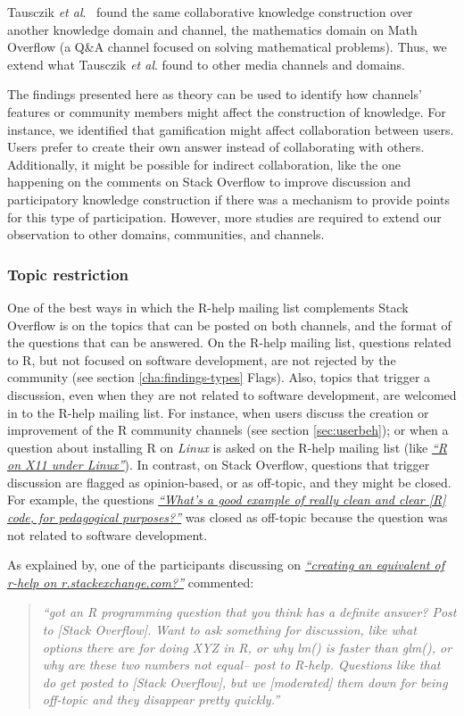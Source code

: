     Tausczik \textit{et al}.~\cite{Tausczik2014} found the same collaborative knowledge construction over another knowledge domain and channel, the mathematics domain on Math Overflow (a Q\&A channel focused on solving mathematical problems).
    Thus, we extend what Tausczik \textit{et al}. found to other media channels and domains.

    The findings presented here as theory can be used to identify how channels' features or community members might affect the construction of knowledge.
    For instance, we identified that gamification might affect collaboration between users. 
    Users prefer to create their own answer instead of collaborating with others.
    Additionally, it might be possible for indirect collaboration, like the one happening on the comments on Stack Overflow to improve discussion and participatory knowledge construction if there was a mechanism to provide points for this type of participation.
    However, more studies are required to extend our observation to other domains, communities, and channels.

\subsubsection{Topic restriction}

    One of the best ways in which the R-help mailing list complements Stack Overflow is on the topics that can be posted on both channels, and the format of the questions that can be answered. 
    On the R-help mailing list, questions related to R, but not focused on software development, are not rejected by the community (see section \ref{cha:findings-types} Flags).
    Also, topics that trigger a discussion, even when they are not related to software development, are welcomed in to the R-help mailing list.
    For instance, when users discuss the creation or improvement of the R community channels (see section \ref{sec:userbeh}); or when a question about installing R on \textit{Linux} is asked on the R-help mailing list (like {\href{http://goo.gl/1JLOUF}{\textit{``R on X11 under Linux''}}}).
    In contrast, on Stack Overflow, questions that trigger discussion are flagged as opinion-based, or as off-topic, and they might be closed. 
    For example, the questions \textit{\href{http://goo.gl/9JjZW1}{``What's a good example of really clean and clear [R] code, for pedagogical purposes?''}} was closed as off-topic because the question was not related to software development.

    As explained by, one of the participants discussing on \textit{\href{http://goo.gl/mTccwx}{``creating an equivalent of r-help on r.stackexchange.com?''}} commented:
    \begin{quote}
        \textit{``got an R programming question that you think has a definite answer? Post to [Stack Overflow]. Want to ask something for discussion, like what options there are for doing XYZ in R, or why lm() is faster than glm(), or why are these two numbers not equal-- post to R-help. Questions like that do get posted to [Stack Overflow], but we [moderated] them down for being off-topic and they disappear pretty quickly.''}
    \end{quote}

